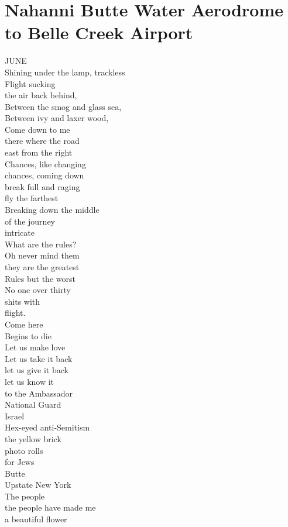 \documentclass[smalldemyvopaper,11pt,twoside,onecolumn,openright,extrafontsizes]{memoir}
\begin{document}
\chapter{Nahanni Butte Water Aerodrome to Belle Creek Airport}
JUNE
\\Shining under the lamp, trackless
\\Flight sucking
\\the air back behind,
\\Between the smog and glass sea,
\\Between ivy and laxer wood,
\\Come down to me
\\there where the road
\\east from the right
\\Chances, like changing
\\chances, coming down
\\break full and raging
\\fly the farthest
\\Breaking down the middle
\\of the journey
\\intricate
\\What are the rules?
\\Oh never mind them
\\they are the greatest
\\Rules but the worst
\\No one over thirty
\\shits with
\\flight.
\\Come here
\\Begins to die
\\Let us make love
\\Let us take it back
\\let us give it back
\\let us know it
\\to the Ambassador
\\National Guard
\\Israel
\\Hex-eyed anti-Semitism
\\the yellow brick
\\photo rolls
\\for Jews
\\Butte
\\Upstate New York
\\The people
\\the people have made me
\\a beautiful flower
\end{document}
